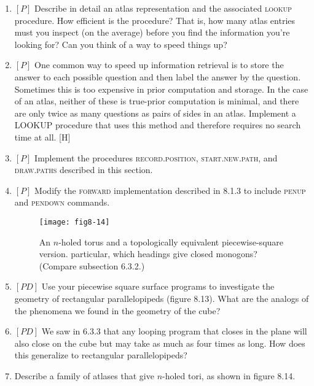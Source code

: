\documentclass{book}
\begin{document}
\begin{enumerate}
\item $[P]$ Describe in detail an atlas representation and the associated
\textsc{lookup} procedure. How efficient is the procedure? That is, how many
atlas entries must you inspect (on the average) before you find the
information you're looking for? Can you think of a way to speed things
up?

\item $[P]$ One common way to speed up information retrieval is to store
the answer to each possible question and then label the answer by
the question. Sometimes this is too expensive in prior computation
and storage. In the case of an atlas, neither of these is true-prior
computation is minimal, and there are only twice as many questions as
pairs of sides in an atlas. Implement a LOOKUP procedure that uses this
method and therefore requires no search time at all. [H]

\item $[P]$ Implement the procedures \textsc{record}\textsc{.position}, \textsc{start}\textsc{.new}\textsc{.path},
and \textsc{draw}\textsc{.paths} described in this section.

\item $[P]$ Modify the \textsc{forward} implementation described in 8.1.3 to include
\textsc{penup} and \textsc{pendown} commands.

\begin{figure}
\begin{center}
\texttt{[image: fig8-14]}
\caption{An $n$-holed torus and a topologically equivalent piecewise-square version. particular, which headings give closed monogons? (Compare subsection 6.3.2.)}
\end{center}
\end{figure}

\item $[PD]$ Use your piecewise square surface programs to investigate the
geometry of rectangular parallelopipeds (figure 8.13). What are the
analogs of the phenomena we found in the geometry of the cube? 

\item $[PD]$ We saw in 6.3.3 that any looping program that closes in the
plane will also close on the cube but may take as much as four times as
long. How does this generalize to rectangular parallelopipeds?

\item Describe a family of atlases that give $n$-holed tori, as shown in figure
8.14.


\end{enumerate}
\end{document}
